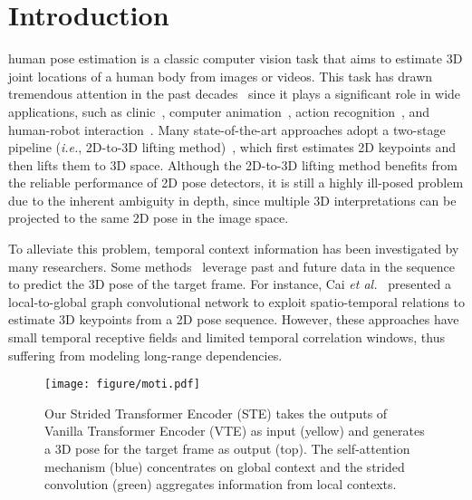 \documentclass[journal]{IEEEtran}
\begin{document}
\section{Introduction}
 human pose estimation is a classic computer vision task that aims to estimate 3D joint locations of a human body from images or videos. 
This task has drawn tremendous attention in the past decades~\cite{radwan2013monocular,li20143d,zhao20183,hu20213dbodynet} since it plays a significant role in wide applications, such as clinic~\cite{kadkhodamohammadi2021generalizable}, computer animation~\cite{pullen2002motion}, action recognition~\cite{wang2018depth,liu2017robust,liu2018recognizing,wei2019learning,song2021constructing,chen2021learning,li2021memory,yang2021unik,zhang2017action,chen2017multi}, and human-robot interaction~\cite{garcia2019human,gui2018teaching}. 
Many state-of-the-art approaches adopt a two-stage pipeline (\emph{i.e.}, 2D-to-3D lifting method)~\cite{martinez2017simple,pavllo20193d,hua2021weakly}, which first estimates 2D keypoints and then lifts them to 3D space. 
Although the 2D-to-3D lifting method benefits from the reliable performance of 2D pose detectors, it is still a highly ill-posed problem due to the inherent ambiguity in depth, since multiple 3D interpretations can be projected to the same 2D pose in the image space. 

To alleviate this problem, temporal context information has been investigated by many researchers. 
Some methods~\cite{lee2018propagating,rayat2018exploiting,cai2019exploiting} leverage past and future data in the sequence to predict the 3D pose of the target frame. 
For instance, Cai \emph{et al.}~\cite{cai2019exploiting} presented a local-to-global graph convolutional network to exploit spatio-temporal relations to estimate 3D keypoints from a 2D pose sequence.
However, these approaches have small temporal receptive fields and limited temporal correlation windows, thus suffering from modeling long-range dependencies. 

\begin{figure}[t]
   \centering
   \texttt{[image: figure/moti.pdf]}
   \caption
   {
      Our Strided Transformer Encoder (STE) takes the outputs of Vanilla Transformer Encoder (VTE) as input (yellow) and generates a 3D pose for the target frame as output (top). 
      The self-attention mechanism (blue) concentrates on global context and the strided convolution (green) aggregates information from local contexts. 
   }
   \label{fig:moti}
\end{figure}
\end{document}
